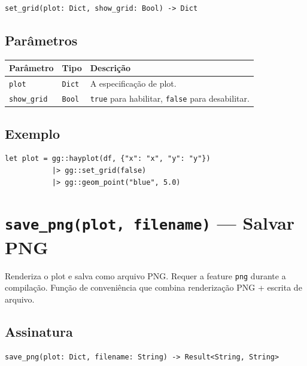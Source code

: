 \documentclass[12pt, a4paper, oneside]{book}
\newcommand{\code}[1]{\texttt{#1}}
\begin{document}
\begin{lstlisting}[style=inline]
set_grid(plot: Dict, show_grid: Bool) -> Dict
\end{lstlisting}

\subsection*{Parâmetros}

\begin{tabularx}{\textwidth}{@{}lL{2.5cm}X@{}}
  \toprule
  \textbf{Parâmetro} & \textbf{Tipo} & \textbf{Descrição} \\
  \midrule
  \code{plot}      & \code{Dict}   & A especificação de plot. \\[4pt]
  \code{show\_grid} & \code{Bool}   & \code{true} para habilitar, \code{false} para desabilitar. \\
  \bottomrule
\end{tabularx}

\subsection*{Exemplo}

\begin{lstlisting}[caption={Plot sem grid}]
let plot = gg::hayplot(df, {"x": "x", "y": "y"})
           |> gg::set_grid(false)
           |> gg::geom_point("blue", 5.0)
\end{lstlisting}

\section{\texttt{save\_png(plot, filename)} --- Salvar PNG}

Renderiza o plot e salva como arquivo PNG. Requer a feature \code{png} durante a compilação. Função de conveniência que combina renderização PNG + escrita de arquivo.

\subsection*{Assinatura}

\begin{lstlisting}[style=inline]
save_png(plot: Dict, filename: String) -> Result<String, String>
\end{lstlisting}
\end{document}
